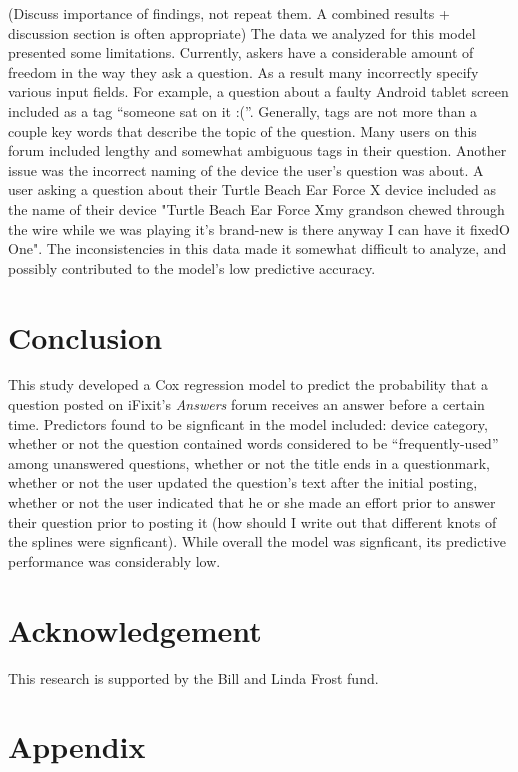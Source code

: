\documentclass[12pt]{article}
\begin{document}
(Discuss importance of findings, not repeat them. A combined results + discussion section is often appropriate) 
The data we analyzed for this model presented some limitations. Currently, askers have a considerable amount of freedom in the way they ask a question. As a result many incorrectly specify various input fields. For example, a question about a faulty Android tablet screen included as a tag ``someone sat on it :(''. Generally, tags are not more than a couple key words that describe the topic of the question. Many users on this forum included lengthy and somewhat ambiguous tags in their question. Another issue was the incorrect naming of the device the user's question was about. A user asking a question about their Turtle Beach Ear Force X device included as the name of their device "Turtle Beach Ear Force Xmy grandson chewed through the wire while we was playing it's brand-new is there anyway I can have it fixedO One". The inconsistencies in this data made it somewhat difficult to analyze, and possibly contributed to the model's low predictive accuracy. 

\section{Conclusion}

This study developed a Cox regression model to predict the probability that a question posted on iFixit's \textit{Answers} forum receives an answer before a certain time. Predictors found to be signficant in the model included: device category, whether or not the question contained words considered to be ``frequently-used'' among unanswered questions, whether or not the title ends in a questionmark, whether or not the user updated the question's text after the initial posting, whether or not the user indicated that he or she made an effort prior to answer their question prior to posting it (how should I write out that different knots of the splines were signficant). While overall the model was signficant, its predictive performance was considerably low. 

\section{Acknowledgement}

This research is supported by the Bill and Linda Frost fund. 


\section{Appendix} 
\end{document}
